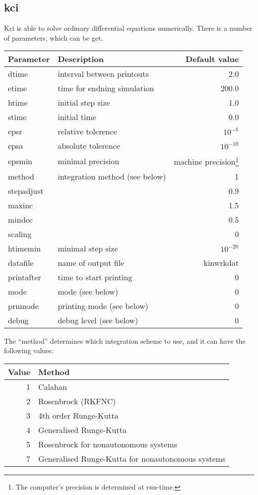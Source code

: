 \subsection{kci}
Kci is able to solve ordinary differential equations numerically.
There is a number of parameters, which can be get.

\begin{center}
\begin{tabular}{llr}
\hline
Parameter & Description & Default value \\ \hline
dtime     & interval between printouts & 2.0 \\
etime     & time for endning simulation & 200.0 \\
htime     & initial step size & 1.0 \\
stime     & initial time & 0.0 \\
epsr      & relative tolerence & $10^{-5}$ \\
epsa      & absolute tolerence & $10^{-10}$ \\
epsmin    & minimal precision  & machine precision\footnote{The
  computer's precision is determined at run-time.} \\
method    & integration method (see below) & 1 \\
stepadjust &            & 0.9 \\
maxinc    &             & 1.5 \\
mindec    &             & 0.5 \\
scaling   &             & 0 \\
htimemin  & minimal step size & $10^{-20}$ \\
datafile  & name of output file & kinwrkdat \\
printafter & time to start printing & 0\\
mode      & mode (see below) & 0 \\ 
prnmode   & printing mode (see below) & 0 \\
debug     & debug level (see below) & 0 \\
\hline
\end{tabular}
\end{center}

The ``method'' determines which integration scheme to use, and it can have
the following values: 

\begin{center}
\begin{tabular}{rl}
\hline
Value      & Method \\ \hline
1          & Calahan \\
2          & Rosenbrock (RKFNC) \\
3          & 4th order Runge-Kutta \\
4          & Generalised Runge-Kutta \\
5          & Rosenbrock for nonautonomous systems \\
7          & Generalised Runge-Kutta for nonautonomous systems \\ 
\hline
\end{tabular}
\end{center}


